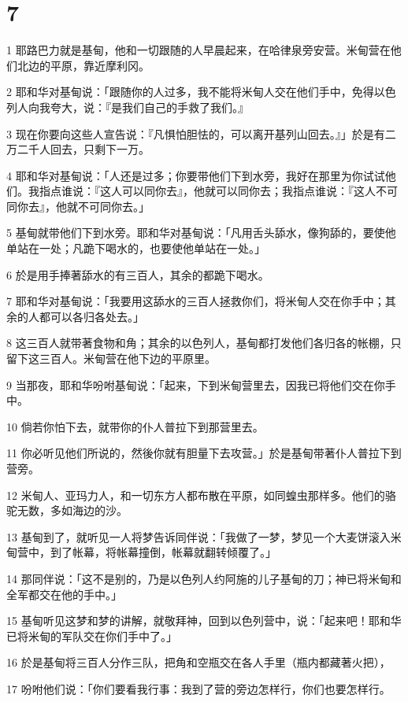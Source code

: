 \chapter{7}

\par 1 耶路巴力就是基甸，他和一切跟随的人早晨起来，在哈律泉旁安营。米甸营在他们北边的平原，靠近摩利冈。
\par 2 耶和华对基甸说：「跟随你的人过多，我不能将米甸人交在他们手中，免得以色列人向我夸大，说：『是我们自己的手救了我们。』
\par 3 现在你要向这些人宣告说：『凡惧怕胆怯的，可以离开基列山回去。』」於是有二万二千人回去，只剩下一万。
\par 4 耶和华对基甸说：「人还是过多；你要带他们下到水旁，我好在那里为你试试他们。我指点谁说：『这人可以同你去』，他就可以同你去；我指点谁说：『这人不可同你去』，他就不可同你去。」
\par 5 基甸就带他们下到水旁。耶和华对基甸说：「凡用舌头舔水，像狗舔的，要使他单站在一处；凡跪下喝水的，也要使他单站在一处。」
\par 6 於是用手捧著舔水的有三百人，其余的都跪下喝水。
\par 7 耶和华对基甸说：「我要用这舔水的三百人拯救你们，将米甸人交在你手中；其余的人都可以各归各处去。」
\par 8 这三百人就带著食物和角；其余的以色列人，基甸都打发他们各归各的帐棚，只留下这三百人。米甸营在他下边的平原里。
\par 9 当那夜，耶和华吩咐基甸说：「起来，下到米甸营里去，因我已将他们交在你手中。
\par 10 倘若你怕下去，就带你的仆人普拉下到那营里去。
\par 11 你必听见他们所说的，然後你就有胆量下去攻营。」於是基甸带著仆人普拉下到营旁。
\par 12 米甸人、亚玛力人，和一切东方人都布散在平原，如同蝗虫那样多。他们的骆驼无数，多如海边的沙。
\par 13 基甸到了，就听见一人将梦告诉同伴说：「我做了一梦，梦见一个大麦饼滚入米甸营中，到了帐幕，将帐幕撞倒，帐幕就翻转倾覆了。」
\par 14 那同伴说：「这不是别的，乃是以色列人约阿施的儿子基甸的刀；神已将米甸和全军都交在他的手中。」
\par 15 基甸听见这梦和梦的讲解，就敬拜神，回到以色列营中，说：「起来吧！耶和华已将米甸的军队交在你们手中了。」
\par 16 於是基甸将三百人分作三队，把角和空瓶交在各人手里（瓶内都藏著火把），
\par 17 吩咐他们说：「你们要看我行事：我到了营的旁边怎样行，你们也要怎样行。
